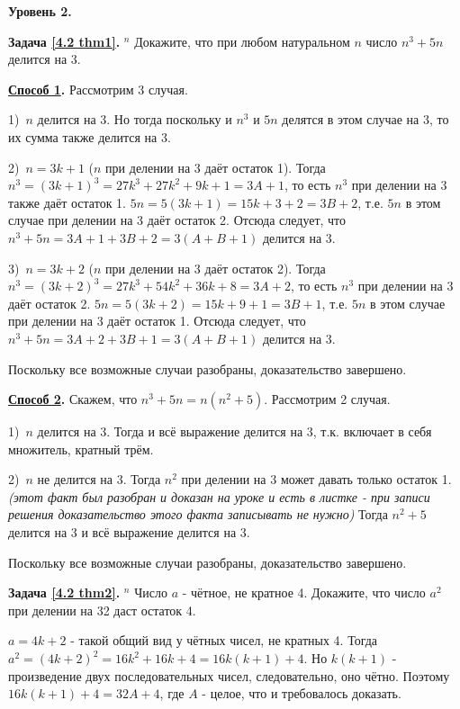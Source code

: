 \begin{center}
\textbf{Уровень 2.}
\end{center}

\textbf{Задача \ref{4.2 thm1}.} $^n$
    Докажите, что при любом натуральном $n$ число $n^3 + 5n$ делится на 3.
\begin{prf}
    \par
    \textbf{\underline{Способ 1}.}
        Рассмотрим 3 случая. 
    \par
        1)~$n$ делится на 3. Но тогда поскольку и $n^3$ и $5n$ делятся в этом случае на 3, то их сумма также делится на 3. 
    \par
        2)~$n = 3k + 1$ ($n$ при делении на 3 даёт остаток 1). Тогда $n^3 = (3k +1)^3 = 27k^3 + 27k^2 + 9k + 1 = 3A + 1$, то есть $n^3$ при делении на 3 также даёт остаток 1. $5n = 5(3k + 1) = 15k + 3 + 2 = 3B + 2$, т.е. $5n$ в этом случае при делении на 3 даёт остаток 2. Отсюда следует, что $n^3 + 5n = 3A + 1 + 3B + 2 = 3(A + B + 1)$ делится на 3. 
    \par
        3)~$n = 3k + 2$ ($n$ при делении на 3 даёт остаток 2). Тогда $n^3 = (3k +2)^3 = 27k^3 + 54k^2 + 36k + 8 = 3A + 2$, то есть $n^3$ при делении на 3 даёт остаток 2. $5n = 5(3k + 2) = 15k + 9 + 1 = 3B + 1$, т.е. $5n$ в этом случае при делении на 3 даёт остаток 1. Отсюда следует, что $n^3 + 5n = 3A + 2 + 3B + 1 = 3(A + B + 1)$ делится на 3. 
    \par
        Поскольку все возможные случаи разобраны, доказательство завершено. 
    \par
    \textbf{\underline{Способ 2}.}
        Скажем, что $n^3 + 5n = n(n^2 + 5)$. Рассмотрим 2 случая.
    \par
        1)~$n$ делится на 3. Тогда и всё выражение делится на 3, т.к. включает в себя множитель, кратный трём.
    \par
        2)~$n$ не делится на 3. Тогда $n^2$ при делении на 3 может давать только остаток 1. \textit{(этот факт был разобран и доказан на уроке и есть в листке - при записи решения доказательство этого факта записывать не нужно)} Тогда $n^2+5$ делится на 3 и всё выражение делится на 3.
    \par
        Поскольку все возможные случаи разобраны, доказательство завершено. 
    \par
\end{prf}

\newpage

\textbf{Задача \ref{4.2 thm2}.} $^n$
    Число $a$ - чётное, не кратное 4. Докажите, что число $a^2$ при делении на 32 даст остаток 4.
\begin{prf}
    $a = 4k + 2$ - такой общий вид у чётных чисел, не кратных 4. Тогда $a^2 = (4k + 2)^2 = 16k^2 + 16k + 4 = 16k(k+1) + 4$. Но $k(k+1)$ - произведение двух последовательных чисел, следовательно, оно чётно. Поэтому $16k(k+1) + 4 = 32A + 4$, где $A$ - целое, что и требовалось доказать.
\end{prf}

